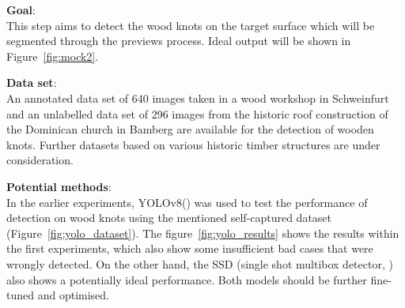 \renewcommand\thesection{\arabic{section}}
\renewcommand\thesubsection{\thesection.\arabic{subsection}}



\textbf{Goal}:\\
This step aims to detect the wood knots on the target surface which will be segmented through the previews process. Ideal output will be shown in Figure~\ref{fig:mock2}.

\hspace*{\fill}

\textbf{Data set}:\\
An annotated data set of 640 images taken in a wood workshop in Schweinfurt and an unlabelled data set of 296 images from the historic roof construction of the Dominican church in Bamberg are available for the detection of wooden knots. Further datasets based on various historic timber structures are under consideration.

\hspace*{\fill}

\textbf{Potential methods}:\\
In the earlier experiments, YOLOv8(\cite{yolov8_ultralytics}) was used to test the performance of detection on wood knots using the mentioned self-captured dataset (Figure~\ref{fig:yolo_dataset}). The figure~\ref{fig:yolo_results} shows the results within the first experiments, which also show some insufficient bad cases that were wrongly detected. On the other hand, the SSD (single shot multibox detector, \cite{jia2014caffe}) also shows a potentially ideal performance. Both models should be further fine-tuned and optimised. 

